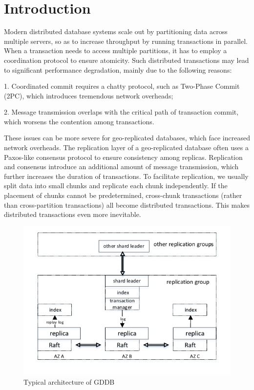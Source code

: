 \documentclass[conference]{IEEEtran}
\begin{document}
\section{Introduction}

Modern distributed database systems scale out by partitioning data across multiple servers,
so as to increase throughput by running transactions in parallel.
When a transaction needs to access multiple partitions, it has to employ a coordination protocol to ensure atomicity.
Such distributed transactions may lead to significant performance degradation, mainly due to the following reasons\cite{Calvin:conf/sigmod/ThomsonDWRSA12}:

1. Coordinated commit requires a chatty protocol, such as Two-Phase Commit (2PC), which introduces tremendous network overheads;

2. Message transmission overlaps with the critical path of transaction commit, which worsens the contention among transactions.

These issues can be more severe for geo-replicated databases, which face increased network overheads.
The replication layer of a geo-replicated database often uses a Paxos-like consensus protocol to ensure consistency among replicas.
Replication and consensus introduce an additional amount of message transmission, which further increases the duration of transactions.
To facilitate replication, we usually split data into small chunks and replicate each chunk independently.
If the placement of chunks cannot be predetermined, cross-chunk transactions (rather than cross-partition transactions) all become distributed transactions.
This makes distributed transactions even more inevitable.

\begin{figure}[tbp]
  \centerline{\includegraphics[scale=0.8]{figure/architecture.pdf}}
  \caption{Typical architecture of GDDB}
  \label{fig:architecture}
\end{figure}
\end{document}
